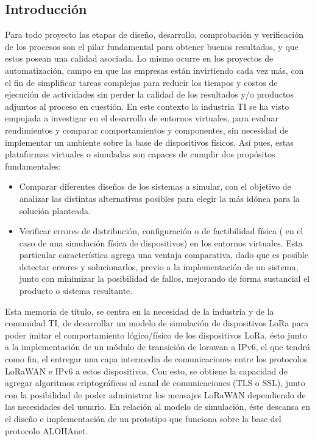 \begin{justify}
\chapter{Introducción}
%
Para todo proyecto las etapas de diseño, desarrollo, comprobación y verificación de los procesos son el pilar fundamental para obtener buenos resultados, y que estos posean una calidad asociada. Lo mismo ocurre en los proyectos de automatización, campo en que las empresas están invirtiendo cada vez más, con el fin de simplificar tareas complejas para reducir los tiempos y costos de ejecución de actividades sin perder la calidad de los resultados y/o productos adjuntos al proceso en cuestión. En este contexto la industria TI se ha visto empujada a investigar en el desarrollo de entornos virtuales, para evaluar rendimientos y comparar comportamientos y componentes, sin necesidad de implementar un ambiente sobre la base de dispositivos físicos. Así pues, estas plataformas virtuales o simuladas son capaces de cumplir dos propósitos fundamentales:\\
\begin{itemize}
\item Comparar diferentes diseños de los sistemas a simular, con el objetivo de analizar las distintas alternativas posibles para elegir la más idónea para la solución planteada.
\item Verificar errores de distribución, configuración o de factibilidad física ( en el caso de una simulación física de dispositivos) en los entornos virtuales. Esta particular característica agrega una ventaja comparativa, dado que es posible detectar errores y solucionarlos, previo a la implementación de un sistema, junto con minimizar la posibilidad de fallos, mejorando de forma sustancial el producto o sistema resultante.
\end{itemize}
Esta memoria de título, se centra en la necesidad de la industria y de la comunidad TI, de desarrollar un modelo de simulación de dispositivos LoRa para poder imitar el comportamiento lógico/físico de los dispositivos LoRa, ésto junto a la implementación de un módulo de transición de \gls{lorawan} a IPv6, el que tendrá como fin, el entregar una capa intermedia de comunicaciones entre los protocolos LoRaWAN e IPv6 a estos dispositivos. Con esto, se obtiene la capacidad de agregar algoritmos criptográficos al canal de comunicaciones (TLS o SSL), junto con la posibilidad de poder administrar los mensajes LoRaWAN dependiendo de las necesidades del usuario. En relación al modelo de simulación, éste descansa en el diseño e implementación de un prototipo que funciona sobre la base del protocolo ALOHAnet.


\end{justify}
